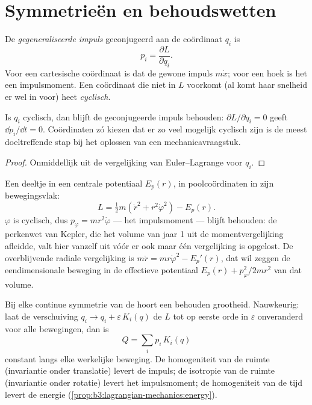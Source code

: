 \section{Symmetrieën en behoudswetten}

\begin{definition}\label{def:b3:lagrangian-mechanics:momentum}
De \emph{gegeneraliseerde impuls} geconjugeerd aan de coördinaat $q_i$ is
\[
p_i = \frac{\partial L}{\partial\dot q_i} .
\]
Voor een cartesische coördinaat is dat de gewone impuls $m\dot x$; voor
een hoek is het een impulsmoment. Een coördinaat die niet in $L$ voorkomt
(al komt haar snelheid er wel in voor) heet \emph{cyclisch}.
\end{definition}

\begin{proposition}\label{prop:b3:lagrangian-mechanics:cyclic}
Is $q_i$ cyclisch, dan blijft de geconjugeerde impuls behouden:
$\partial L/\partial q_i = 0$ geeft $\dd p_i/\dd t = 0$. Coördinaten zó
kiezen dat er zo veel mogelijk cyclisch zijn is de meest doeltreffende
stap bij het oplossen van een mechanicavraagstuk.
\end{proposition}

\begin{proof}
Onmiddellijk uit de vergelijking van Euler--Lagrange voor $q_i$.
\end{proof}

\begin{example}\label{ex:b3:lagrangian-mechanics:central}
Een deeltje in een centrale potentiaal $E_p(r)$, in poolcoördinaten in
zijn bewegingsvlak:
\[
L = \tfrac12 m(\dot r^2 + r^2\dot\varphi^2) - E_p(r) .
\]
$\varphi$ is cyclisch, dus $p_\varphi = mr^2\dot\varphi$ --- het
impulsmoment --- blijft behouden: de perkenwet van Kepler, die het volume
van jaar 1 uit de momentvergelijking afleidde, valt hier vanzelf uit vóór
er ook maar één vergelijking is opgelost. De overblijvende radiale
vergelijking is $m\ddot r = mr\dot\varphi^2 - E_p'(r)$, dat wil zeggen de
eendimensionale beweging in de effectieve potentiaal $E_p(r) + p_\varphi^2/2mr^2$ van dat volume.
\end{example}

\begin{theorem}\label{thm:b3:lagrangian-mechanics:noether}
Bij elke continue symmetrie van de  hoort een behouden
grootheid. Nauwkeurig: laat de verschuiving $q_i \to q_i + \varepsilon\,K_i(q)$ de $L$ tot op eerste orde in $\varepsilon$
onveranderd voor alle bewegingen, dan is
\[
Q = \sum_i p_i\,K_i(q)
\]
constant langs elke werkelijke beweging. De homogeniteit van de ruimte
(invariantie onder translatie) levert de impuls; de isotropie van de
ruimte (invariantie onder rotatie) levert het impulsmoment; de
homogeniteit van de tijd levert de energie
(\cref{prop:b3:lagrangian-mechanics:energy}).
\end{theorem}

